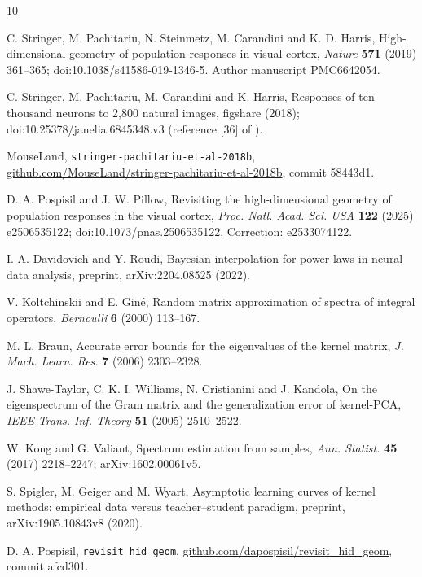 \documentclass[11pt]{article}
\theoremstyle{definition}
\begin{document}
\begin{thebibliography}{10}
\footnotesize\raggedright

 C. Stringer, M. Pachitariu, N. Steinmetz, M. Carandini and K. D. Harris, High-dimensional geometry of population responses in visual cortex, \emph{Nature} \textbf{571} (2019) 361--365; doi:10.1038/s41586-019-1346-5. Author manuscript PMC6642054.

 C. Stringer, M. Pachitariu, M. Carandini and K. Harris, Responses of ten thousand neurons to 2,800 natural images, figshare (2018); doi:10.25378/janelia.6845348.v3 (reference [36] of \cite{stringer2019}).

 MouseLand, \texttt{stringer-pachitariu-et-al-2018b}, \url{github.com/MouseLand/stringer-pachitariu-et-al-2018b}, commit 58443d1.

 D. A. Pospisil and J. W. Pillow, Revisiting the high-dimensional geometry of population responses in the visual cortex, \emph{Proc. Natl. Acad. Sci. USA} \textbf{122} (2025) e2506535122; doi:10.1073/pnas.2506535122. Correction: e2533074122.

 I. A. Davidovich and Y. Roudi, Bayesian interpolation for power laws in neural data analysis, preprint, arXiv:2204.08525 (2022).

 V. Koltchinskii and E. Gin\'e, Random matrix approximation of spectra of integral operators, \emph{Bernoulli} \textbf{6} (2000) 113--167.

 M. L. Braun, Accurate error bounds for the eigenvalues of the kernel matrix, \emph{J. Mach. Learn. Res.} \textbf{7} (2006) 2303--2328.

 J. Shawe-Taylor, C. K. I. Williams, N. Cristianini and J. Kandola, On the eigenspectrum of the Gram matrix and the generalization error of kernel-PCA, \emph{IEEE Trans. Inf. Theory} \textbf{51} (2005) 2510--2522.

 W. Kong and G. Valiant, Spectrum estimation from samples, \emph{Ann. Statist.} \textbf{45} (2017) 2218--2247; arXiv:1602.00061v5.

 S. Spigler, M. Geiger and M. Wyart, Asymptotic learning curves of kernel methods: empirical data versus teacher--student paradigm, preprint, arXiv:1905.10843v8 (2020).

 D. A. Pospisil, \texttt{revisit\_hid\_geom}, \url{github.com/dapospisil/revisit_hid_geom}, commit afcd301.

\end{thebibliography}
\end{document}
